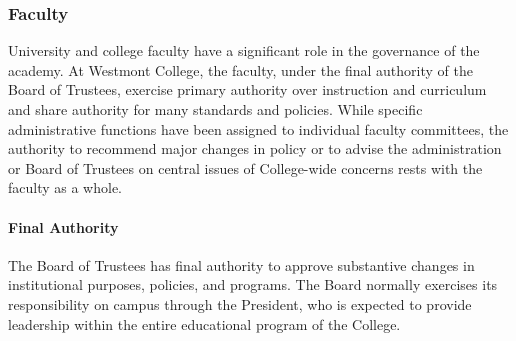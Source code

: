 		\subsubsection{Faculty}
			\label{sec:CollegeOrganization-Faculty}

			University and college faculty have a significant role in the
			governance of the academy. At Westmont College, the faculty, under
			the final authority of the Board of Trustees, exercise primary
			authority over instruction and curriculum and share authority for
			many standards and policies.  While specific administrative
			functions have been assigned to individual faculty committees, the
			authority to recommend major changes in policy or to advise the
			administration or Board of Trustees on central issues of
			College-wide concerns rests with the faculty as a whole.

			\paragraph{Final Authority}

				The Board of Trustees has final authority to approve substantive changes in institutional purposes, policies, and programs.  The Board normally exercises its responsibility on campus through the President, who is expected to provide leadership within the entire educational program of the College.


